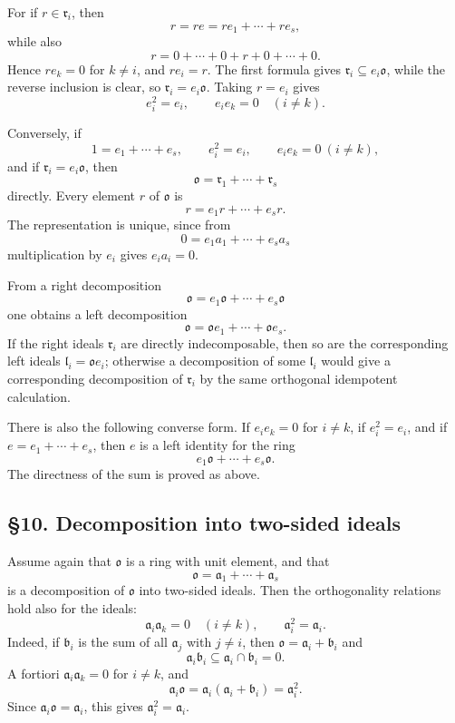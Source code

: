 \documentclass[11pt]{article}
\begin{document}
For if \(r\in\mathfrak r_i\), then \[
  r=re=r e_1+\cdots+r e_s,
\] while also \[
  r=0+\cdots+0+r+0+\cdots+0.
\] Hence \(re_k=0\) for \(k\ne i\), and \(re_i=r\). The first formula
gives \(\mathfrak r_i\subseteq e_i\mathfrak{o}\), while the reverse
inclusion is clear, so \(\mathfrak r_i=e_i\mathfrak{o}\). Taking
\(r=e_i\) gives \[
  e_i^2=e_i,
  \qquad e_i e_k=0\quad(i\ne k).
\]

Conversely, if \[
  1=e_1+\cdots+e_s,
  \qquad e_i^2=e_i,
  \qquad e_i e_k=0\ (i\ne k),
\] and if \(\mathfrak r_i=e_i\mathfrak{o}\), then \[
  \mathfrak{o}=\mathfrak r_1+\cdots+\mathfrak r_s
\] directly. Every element \(r\) of \(\mathfrak{o}\) is \[
  r=e_1r+\cdots+e_sr.
\] The representation is unique, since from \[
  0=e_1a_1+\cdots+e_sa_s
\] multiplication by \(e_i\) gives \(e_i a_i=0\).

From a right decomposition \[
  \mathfrak{o}=e_1\mathfrak{o}+\cdots+e_s\mathfrak{o}
\] one obtains a left decomposition \[
  \mathfrak{o}=\mathfrak{o}e_1+\cdots+\mathfrak{o}e_s.
\] If the right ideals \(\mathfrak r_i\) are directly indecomposable,
then so are the corresponding left ideals
\(\mathfrak l_i=\mathfrak{o}e_i\); otherwise a decomposition of some
\(\mathfrak l_i\) would give a corresponding decomposition of
\(\mathfrak r_i\) by the same orthogonal idempotent calculation.

There is also the following converse form. If \(e_i e_k=0\) for
\(i\ne k\), if \(e_i^2=e_i\), and if \(e=e_1+\cdots+e_s\), then \(e\) is
a left identity for the ring \[
  e_1\mathfrak{o}+\cdots+e_s\mathfrak{o}.
\] The directness of the sum is proved as above.

\subsection{§10. Decomposition into two-sided
ideals}\label{decomposition-into-two-sided-ideals}

Assume again that \(\mathfrak{o}\) is a ring with unit element, and that
\[
  \mathfrak{o}=\mathfrak a_1+\cdots+\mathfrak a_s
\] is a decomposition of \(\mathfrak{o}\) into two-sided ideals. Then
the orthogonality relations hold also for the ideals: \[
  \mathfrak a_i\mathfrak a_k=0\quad(i\ne k),
  \qquad
  \mathfrak a_i^2=\mathfrak a_i.
\] Indeed, if \(\mathfrak b_i\) is the sum of all \(\mathfrak a_j\) with
\(j\ne i\), then \(\mathfrak{o}=\mathfrak a_i+\mathfrak b_i\) and \[
  \mathfrak a_i\mathfrak b_i\subseteq\mathfrak a_i\cap\mathfrak b_i=0.
\] A fortiori \(\mathfrak a_i\mathfrak a_k=0\) for \(i\ne k\), and \[
  \mathfrak a_i\mathfrak{o}=\mathfrak a_i(\mathfrak a_i+\mathfrak b_i)=\mathfrak a_i^2.
\] Since \(\mathfrak a_i\mathfrak{o}=\mathfrak a_i\), this gives
\(\mathfrak a_i^2=\mathfrak a_i\).
\end{document}
